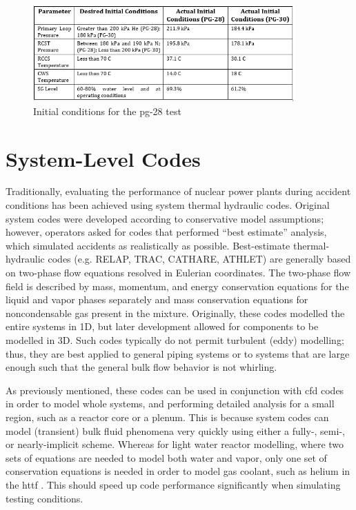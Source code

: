\documentclass[double,12pt]{beavtex}
\begin{document}
\begin{figure}
    \begin{center}
    	\includegraphics[width=10cm]{Figures/PG_28_Initial_Conditions.PNG}
    	\caption{Initial conditions for the \acrshort{pg}-28 test}
    	\label{fig:PG_28_Initial_Conditions}
    	\end{center}
\end{figure}

\section{System-Level Codes}

Traditionally, evaluating the performance of nuclear power plants during accident conditions has been achieved using system thermal hydraulic codes. Original system codes were developed according to conservative model assumptions; however, operators asked for codes that performed “best estimate” analysis, which simulated accidents as realistically as possible. Best-estimate thermal-hydraulic codes (e.g. RELAP, TRAC, CATHARE, ATHLET) are generally based on two-phase flow equations resolved in Eulerian coordinates. The two-phase flow field is described by mass, momentum, and energy conservation equations for the liquid and vapor phases separately and mass conservation equations for noncondensable gas present in the mixture. Originally, these codes modelled the entire systems in 1D, but later development allowed for components to be modelled in 3D. Such codes typically do not permit turbulent (eddy) modelling; thus, they are best applied to general piping systems or to systems that are large enough such that the general bulk flow behavior is not whirling.

As previously mentioned, these codes can be used in conjunction with \acrshort{cfd}  codes in order to model whole systems, and performing detailed analysis for a small region, such as a reactor core or a plenum. This is because system codes can model (transient) bulk fluid phenomena very quickly using either a fully-, semi-, or nearly-implicit scheme. Whereas for light water reactor modelling, where two sets of equations are needed to model both water and vapor, only one set of conservation equations is needed in order to model gas coolant, such as helium in the \acrshort{httf} . This should speed up code performance significantly when simulating testing conditions. 
\end{document}
